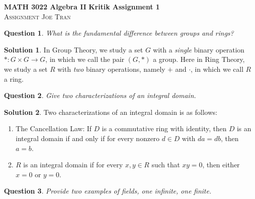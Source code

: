 \documentclass[11pt]{amsart}
\theoremstyle{}\newtheorem{question}{Question}
\theoremstyle{definition}\newtheorem*{solution}{Solution}
\begin{document}
\noindent \textbf{MATH 3022 Algebra II} \hfill \textbf{Kritik Assignment 1} \\
\noindent \textsc{Assignment} \hfill \textsc{Joe Tran}

\vspace{5pt}

\begin{question}
    What is the fundamental difference between groups and rings?
\end{question}

\begin{solution}
    In Group Theory, we study a set $G$ with a \emph{single} binary operation $* : G \times G \to G$, in which we call the pair $(G, *)$ a group. Here in Ring Theory, we study a set $R$ with \emph{two} binary operations, namely $+$ and $\cdot$, in which we call $R$ a ring.
\end{solution}

\begin{question}
    Give two characterizations of an integral domain.
\end{question}

\begin{solution}
    Two characterizations of an integral domain is as follows:
    \begin{enumerate}
        \item The Cancellation Law: If $D$ is a commutative ring with identity, then $D$ is an integral domain if and only if for every nonzero $d \in D$ with $da = db$, then $a = b$.
        \item $R$ is an integral domain if for every $x, y \in R$ such that $xy = 0$, then either $x = 0$ or $y = 0$.
    \end{enumerate}
\end{solution}

\begin{question}
    Provide two examples of fields, one infinite, one finite.
\end{question}
\end{document}
